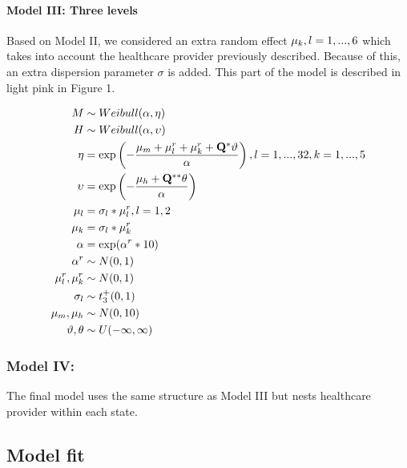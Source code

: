\documentclass[10pt,letterpaper]{article}
\begin{document}
\hypertarget{model-iii-three-levels}{%
\paragraph{Model III: Three levels}\label{model-iii-three-levels}}

Based on Model II, we considered an extra random effect
\(\mathbf{\mu}_k, \space l=1,...,6\) which takes into account the
healthcare provider previously described. Because of this, an extra
dispersion parameter \(\sigma\) is added. This part of the model is
described in light pink in Figure 1.

\[
\begin{aligned}
 M   &\sim Weibull(\alpha,\mathbf{\eta})\\
 H  &\sim Weibull(\alpha,\mathbf{\upsilon}) \\
 \mathbf{\eta} &= \exp \left(-\frac{\mu_m+\mathbf{\mu}_l^r+\mathbf{\mu}_k^r+\mathbf{Q}^*\mathbf{\vartheta}}{\alpha} \right),\space\space l=1,...,32,\space k=1,...,5\\
 \mathbf{\upsilon} &= \exp\left(-\frac{\mu_h+\mathbf{Q}^{**}\mathbf{\theta}}{\alpha}\right) \\
  \mathbf{\mu}_l&=\sigma_l*\mathbf{\mu}_l^r, \space\space l=1,2 \\
 \mathbf{\mu}_k&=\sigma_l*\mathbf{\mu}_k^r \\
 \alpha&=\exp(\alpha^r*10) \\
 \alpha^r&\sim N(0,1) \\
 \mu^r_l,\mu^r_k &\sim N(0,1) \\
 \sigma_l&\sim t^+_3(0,1) \\
 \mu_m,\mu_h &\sim N(0,10) \\
 \mathbf{\vartheta},\mathbf{\theta} &\sim U(-\infty,\infty) \\
\end{aligned}
\]

\hypertarget{model-iv}{%
\subsubsection{Model IV:}\label{model-iv}}

The final model uses the same structure as Model III but nests
healthcare provider within each state.

\hypertarget{model-fit}{%
\subsection{Model fit}\label{model-fit}}
\end{document}
